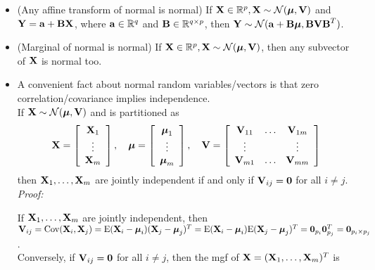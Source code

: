\begin{itemize}
\begin{itemize}
    \item (Any affine transform of normal is normal) If $\mathbf{X} \in \mathbb{R}^p,  \mathbf{X} \sim \mathcal{N}(\boldsymbol{\mu}, \mathbf{V})$ and $\mathbf{Y = a + BX}$,
    where $\mathbf{a} \in \mathbb{R}^q$ and $\mathbf{B} \in \mathbb{R}^{q \times p}$, then $\mathbf{Y} \sim \mathcal{N}(\mathbf{a + B}\boldsymbol{\mu}, \mathbf{BVB}^T)$.
    \item (Marginal of normal is normal) If $\mathbf{X} \in \mathbb{R}^p,  \mathbf{X} \sim \mathcal{N}(\boldsymbol{\mu}, \mathbf{V})$, then any subvector of $\mathbf{X}$ is normal too.
    \item A convenient fact about normal random variables/vectors is that zero correlation/covariance implies independence.\\
    If $\mathbf{X} \sim \mathcal{N}(\boldsymbol{\mu}, \mathbf{V})$ and is partitioned as
    $$
    \mathbf{X} = \left[\begin{array}{c}
    	\mathbf{X}_1\\
    	\vdots\\
    	\mathbf{X}_m\\
    \end{array}\right], \quad \boldsymbol{\mu} = \left[\begin{array}{c}
    \boldsymbol{\mu}_1\\
    \vdots\\
    \boldsymbol{\mu}_m\\
\end{array}\right], \quad \mathbf{V} = \left[\begin{array}{ccc}
\mathbf{V}_{11} & \dots & \mathbf{V}_{1m}\\
\vdots & & \vdots\\
\mathbf{V}_{m1} & \dots & \mathbf{V}_{mm}\\
\end{array}\right]
    $$
    then $\mathbf{X}_1, \dots, \mathbf{X}_m$ are jointly independent if and only if $\mathbf{V}_{ij} = \mathbf{0}$ for all $i \ne j$.\\
    {\it Proof:}
    \begin{pf}
    	If $\mathbf{X}_1, \dots, \mathbf{X}_m$ are jointly independent, then $\mathbf{V}_{ij} = \mbox{Cov}(\mathbf{X}_i, \mathbf{X}_j) = \mbox{E}(\mathbf{X}_i - \boldsymbol{\mu}_i)(\mathbf{X}_j - \boldsymbol{\mu}_j)^T  = \mbox{E}(\mathbf{X}_i - \boldsymbol{\mu}_i)\mbox{E}(\mathbf{X}_j - \boldsymbol{\mu}_j)^T =\mathbf{0}_{p_i}\mathbf{0}_{p_j}^T = \mathbf{0}_{p_i \times p_j}$.\\
    	Conversely, if $\mathbf{V}_{ij} = \mathbf{0}$ for all $i \ne j$, then the mgf of $\mathbf{X} = (\mathbf{X}_1, \dots, \mathbf{X}_m)^T$ is

\end{pf}
\end{itemize}
\end{itemize}
